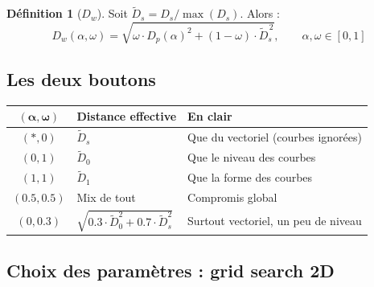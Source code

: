 \documentclass[11pt, a4paper]{article}
\newcommand{\Dp}{D_p}
\newcommand{\Dw}{D_w}
\theoremstyle{definition}
\newtheorem{definition}{Définition}[section]
\theoremstyle{remark}
\begin{document}
\begin{definition}[$\Dw$]
Soit $\tilde{D}_s = D_s / \max(D_s)$. Alors :
\[
  \boxed{
    \Dw(\alpha, \omega) = \sqrt{\omega \cdot \Dp(\alpha)^2
    + (1 - \omega) \cdot \tilde{D}_s^{\,2}},
    \qquad \alpha, \omega \in [0, 1]
  }
\]
\end{definition}

\subsection{Les deux boutons}

\begin{center}
\end{center}

\begin{center}
\begin{tabular}{cll}
  \toprule
  $(\boldsymbol{\alpha}, \boldsymbol{\omega})$ & \textbf{Distance effective} & \textbf{En clair} \\
  \midrule
  $(*, 0)$ & $\tilde{D}_s$ & Que du vectoriel (courbes ignorées) \\
  $(0, 1)$ & $\tilde{D}_0$ & Que le niveau des courbes \\
  $(1, 1)$ & $\tilde{D}_1$ & Que la forme des courbes \\
  $(0.5, 0.5)$ & Mix de tout & Compromis global \\
  $(0, 0.3)$ & $\sqrt{0.3 \cdot \tilde{D}_0^2 + 0.7 \cdot \tilde{D}_s^2}$ & Surtout vectoriel, un peu de niveau \\
  \bottomrule
\end{tabular}
\end{center}

\subsection{Choix des paramètres : grid search 2D}
\end{document}
